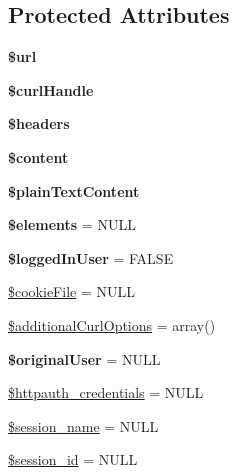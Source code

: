\subsection*{Protected Attributes}
\begin{DoxyCompactItemize}
\item 
\hypertarget{class_drupal_web_test_case_a4602319c57e56cfd4de80d3d58d99c33}{
{\bfseries \$url}}
\label{class_drupal_web_test_case_a4602319c57e56cfd4de80d3d58d99c33}

\item 
\hypertarget{class_drupal_web_test_case_adcb3393cbfce2d08945b059fa0982b92}{
{\bfseries \$curlHandle}}
\label{class_drupal_web_test_case_adcb3393cbfce2d08945b059fa0982b92}

\item 
\hypertarget{class_drupal_web_test_case_a1a571a6bfdae7765a8e0d4431938d113}{
{\bfseries \$headers}}
\label{class_drupal_web_test_case_a1a571a6bfdae7765a8e0d4431938d113}

\item 
\hypertarget{class_drupal_web_test_case_a2c8714ff957ba172102f9bfe70af25ee}{
{\bfseries \$content}}
\label{class_drupal_web_test_case_a2c8714ff957ba172102f9bfe70af25ee}

\item 
\hypertarget{class_drupal_web_test_case_a30f2d25c0f3771ee04989bbf18831255}{
{\bfseries \$plainTextContent}}
\label{class_drupal_web_test_case_a30f2d25c0f3771ee04989bbf18831255}

\item 
\hypertarget{class_drupal_web_test_case_a27ca1fb44586c85ca1998ca9651e8050}{
{\bfseries \$elements} = NULL}
\label{class_drupal_web_test_case_a27ca1fb44586c85ca1998ca9651e8050}

\item 
\hypertarget{class_drupal_web_test_case_ab6dfacb280e215891cbc5fc4f1df5813}{
{\bfseries \$loggedInUser} = FALSE}
\label{class_drupal_web_test_case_ab6dfacb280e215891cbc5fc4f1df5813}

\item 
\hyperlink{class_drupal_web_test_case_abee07354ff94d9b036c7b2e1b1855176}{\$cookieFile} = NULL
\item 
\hyperlink{class_drupal_web_test_case_a8e4e1c5a9b63d403d10ad2f6a2f06aaa}{\$additionalCurlOptions} = array()
\item 
\hypertarget{class_drupal_web_test_case_a110c8164d28753a6cee415f8e199c63f}{
{\bfseries \$originalUser} = NULL}
\label{class_drupal_web_test_case_a110c8164d28753a6cee415f8e199c63f}

\item 
\hyperlink{class_drupal_web_test_case_a1d8ed55611dfba216fc9a7eaaca59b8d}{\$httpauth\_\-credentials} = NULL
\item 
\hyperlink{class_drupal_web_test_case_acb07ddaedaef0c5d08610666ec74cb45}{\$session\_\-name} = NULL
\item 
\hyperlink{class_drupal_web_test_case_a2f8ec9f9c31df56f5502f473e7b78e31}{\$session\_\-id} = NULL
\end{DoxyCompactItemize}


